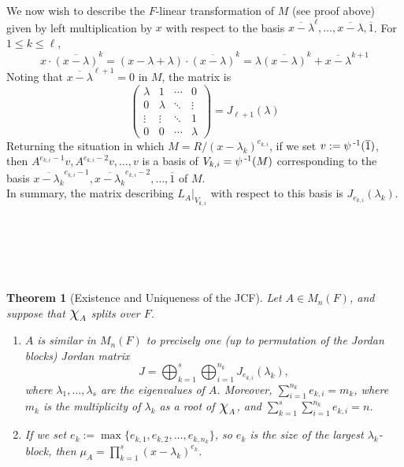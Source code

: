 \documentclass[11pt]{book}
\newcounter{counter}
\newtheorem{theorem}[counter]{Theorem}   \newtheorem*{theorem*}{Theorem}   \newtheorem{lemma}[counter]{Lemma}   \newtheorem{corollary}[counter]{Corollary}
\theoremstyle{definition}   \newtheorem{defn}[counter]{Definition} %
\newcommand{\ov}{\overline}   \newcommand{\wt}{\widetilde}
\newcommand{\mymatrix}[2]{\left( \begin{array}{#1} #2 \end{array} \right)}
\newcommand{\Chi}{\mbox{\Large $\chi$}}
\newcommand{\vs}{\vspace{8pt}}   \newcommand{\hs}{\hspace{8pt}}
\numberwithin{counter}{chapter}
\begin{document}
\vs

We now wish to describe the $F$-linear transformation of $M$ (see proof above) given by left multiplication by $x$ with respect to the basis $\ov{x-\lambda}^\ell,\dots,\ov{x-\lambda},\ov{1}$. For $1 \leq k \leq \ell$,
	\[x \cdot \ov{(x-\lambda)}^k = (x-\lambda + \lambda) \cdot \ov{(x-\lambda)}^k = \lambda \ov{(x-\lambda)}^k + \ov{x-\lambda}^{k+1}\]
Noting that $\ov{x-\lambda}^{\ell+1} = 0$ in $M$, the matrix is
	\[\mymatrix{cccc}{\lambda & 1 & \cdots & 0 \\ 0 & \lambda & \ddots & \vdots \\ \vdots & \vdots & \ddots & 1 \\ 0 & 0 & \cdots & \lambda} = J_{\ell+1}(\lambda) \]
Returning the situation in which $M = R/(x-\lambda_k)^{e_{k,i}}$, if we set $v := \psi\inv(\ov{1})$, then $A^{e_{k,i}-1} v, A^{e_{k,i}-2}v, \dots, v$ is a basis of $V_{k,i} = \psi\operatorname{^{-1}}(M)$ corresponding to the basis $\ov{x-\lambda_k}^{e_{k,i}-1},\ov{x-\lambda_k}^{e_{k,i}-2},\dots,\ov{1}$ of $M$. \\

In summary, the matrix describing $L_A|_{V_{k,i}}$ with respect to this basis is $J_{e_{k,i}}(\lambda_k)$. 

\vs \ \\ \ \\ \ \\ \ \\

\begin{theorem}[Existence and Uniqueness of the JCF] Let $A \in M_n(F)$, and suppose that $\Chi_A$ splits over $F$.
\begin{enumerate}
\item[(a)] $A$ is similar in $M_n(F)$ to precisely one (up to permutation of the Jordan blocks) Jordan matrix
	\[J = \bigoplus_{k=1}^s \bigoplus_{i=1}^{n_k} J_{e_{k,i}}(\lambda_k), \]
where $\lambda_1,\dots,\lambda_s$ are the eigenvalues of $A$. Moreover, $\sum_{i=1}^{n_k} e_{k,i} = m_k$, where $m_k$ is the multiplicity of $\lambda_k$ as a root of $\Chi_A$, and $\sum_{k=1}^s \sum_{i=1}^{n_k} e_{k,i} = n$.

\item[(b)] If we set $e_k := \max\{e_{k,1},e_{k,2},\dots,e_{k,n_k}\}$, so $e_k$ is the size of the largest $\lambda_k$-block, then $\mu_A = \prod_{k=1}^s (x-\lambda_k)^{e_k}$. 
\end{enumerate}
\end{theorem}
\end{document}
